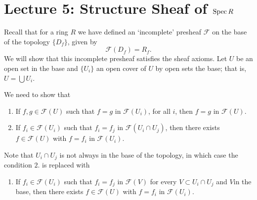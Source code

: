 \newpage

\section*{Lecture 5: Structure Sheaf of $\operatorname{Spec} R$}
Recall that for a ring $R$ we have defined an `incomplete' presheaf $\mathcal{F}$ on the base of the topology $\{D_f\}$, given by 
\[
\mathcal{F}(D_f) = R_f.
\]
We will show that this incomplete presheaf satisfies the sheaf axioms.
Let \(U\) be an open set in the base and \(\{U_i\}\) an open cover of \(U\) by open sets the base; that is, \(U = \bigcup U_i\).

We need to show that 
\begin{enumerate}
\item If $f,g\in \mathcal{F}(U)$ such that $f=g$ in $\mathcal{F}(U_i)$, for all $i$, then $f=g$ in $ \mathcal{F}(U)$.
\item If $f_i\in  \mathcal{F}(U_i)$ such that $f_i = f_j$ in $ \mathcal{F}(U_i\cap U_j)$, then there exists $f\in  \mathcal{F}(U)$ with $f=f_i$ in $ \mathcal{F}(U_i)$.
\end{enumerate}
Note that $U_i\cap U_j$ is not always in the base of the topology, in which case the condition $2.$ is replaced with

\begin{enumerate}
\item [2.] If $f_i\in  \mathcal{F}(U_i)$ such that $f_i = f_j$ in $ \mathcal{F}(V)$ for every \(V \subset U_i \cap U_j\) and \(V\)in the base, then there exists $f\in  \mathcal{F}(U)$ with $f=f_i$ in $ \mathcal{F}(U_i)$.
\end{enumerate}

